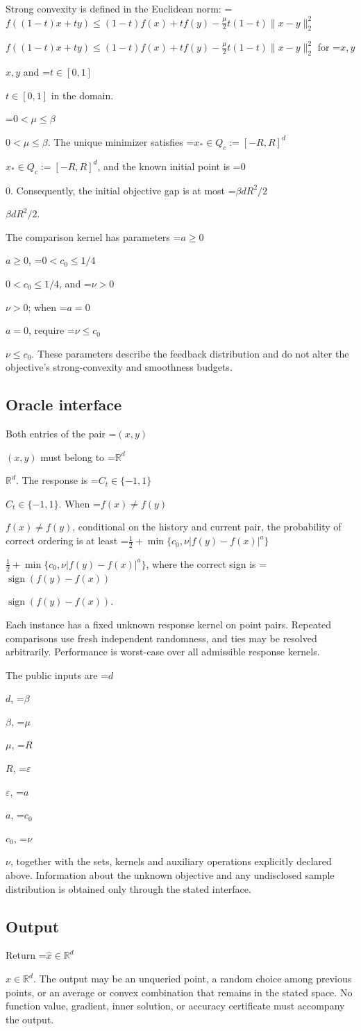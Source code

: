\documentclass[10pt,a4paper]{article}
\newcommand{\AtlasMath}[1]{\par\begingroup\centering\setbox0=\hbox{$\displaystyle #1$}\ifdim\wd0>1.4\linewidth\typeout{ATLAS WIDE FORMULA: \the\wd0}\fi\ifdim\wd0>\linewidth\resizebox{\linewidth}{!}{\box0}\else\box0\fi\par\endgroup}
\newcommand{\AtlasInlineMath}[1]{\begingroup\setbox0=\hbox{$#1$}\ifdim\wd0>.4\linewidth\endgroup\AtlasMath{#1}\else\endgroup$#1$\fi}
\begin{document}
Strong convexity is defined in the Euclidean norm: \AtlasInlineMath{f((1-t)x+ty)\le(1-t)f(x)+tf(y)-\frac{\mu}{2}t(1-t)\|x-y\|_2^2} for \AtlasInlineMath{x,y} and \AtlasInlineMath{t\in[0,1]} in the domain.

\AtlasInlineMath{0<\mu\le\beta}. The unique minimizer satisfies \AtlasInlineMath{x_*\in Q_c:=[-R,R]^d}, and the known initial point is \AtlasInlineMath{0}. Consequently, the initial objective gap is at most \AtlasInlineMath{\beta dR^2/2}.

The comparison kernel has parameters \AtlasInlineMath{a\ge0}, \AtlasInlineMath{0<c_0\le1/4}, and \AtlasInlineMath{\nu>0}; when \AtlasInlineMath{a=0}, require \AtlasInlineMath{\nu\le c_0}. These parameters describe the feedback distribution and do not alter the objective's strong-convexity and smoothness budgets.

\subsection{Oracle interface}
Both entries of the pair \AtlasInlineMath{(x,y)} must belong to \AtlasInlineMath{\mathbb{R}^d}. The response is \AtlasInlineMath{C_t\in\{-1,1\}}. When \AtlasInlineMath{f(x)\ne f(y)}, conditional on the history and current pair, the probability of correct ordering is at least \AtlasInlineMath{\frac12+\min\{c_0,\nu|f(y)-f(x)|^a\}}, where the correct sign is \AtlasInlineMath{\operatorname{sign}(f(y)-f(x))}.

Each instance has a fixed unknown response kernel on point pairs. Repeated comparisons use fresh independent randomness, and ties may be resolved arbitrarily. Performance is worst-case over all admissible response kernels.

The public inputs are \AtlasInlineMath{d}, \AtlasInlineMath{\beta}, \AtlasInlineMath{\mu}, \AtlasInlineMath{R}, \AtlasInlineMath{\varepsilon}, \AtlasInlineMath{a}, \AtlasInlineMath{c_0}, \AtlasInlineMath{\nu}, together with the sets, kernels and auxiliary operations explicitly declared above. Information about the unknown objective and any undisclosed sample distribution is obtained only through the stated interface.

\subsection{Output}
Return \AtlasInlineMath{\widehat{x}\in \mathbb{R}^d}. The output may be an unqueried point, a random choice among previous points, or an average or convex combination that remains in the stated space. No function value, gradient, inner solution, or accuracy certificate must accompany the output.
\end{document}
